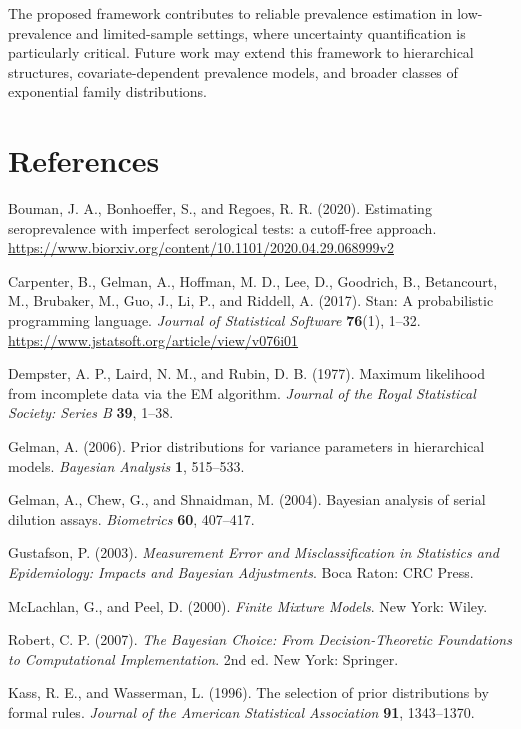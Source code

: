 \documentclass[11pt]{article}
\begin{document}
The proposed framework contributes to reliable prevalence estimation in low-prevalence and limited-sample settings, where uncertainty quantification is particularly critical. Future work may extend this framework to hierarchical structures, covariate-dependent prevalence models, and broader classes of exponential family distributions.



\section*{References}

\noindent

\bibitem Bouman, J. A., Bonhoeffer, S., and Regoes, R. R. (2020).
Estimating seroprevalence with imperfect serological tests: a cutoff-free approach.
{\small \url{https://www.biorxiv.org/content/10.1101/2020.04.29.068999v2}}

\bibitem Carpenter, B., Gelman, A., Hoffman, M. D., Lee, D., Goodrich, B.,
Betancourt, M., Brubaker, M., Guo, J., Li, P., and Riddell, A. (2017).
Stan: A probabilistic programming language.
{\em Journal of Statistical Software} {\bf 76}(1), 1--32.
{\small \url{https://www.jstatsoft.org/article/view/v076i01}}

\bibitem Dempster, A. P., Laird, N. M., and Rubin, D. B. (1977).
Maximum likelihood from incomplete data via the EM algorithm.
{\em Journal of the Royal Statistical Society: Series B} {\bf 39}, 1--38.

\bibitem Gelman, A. (2006).
Prior distributions for variance parameters in hierarchical models.
{\em Bayesian Analysis} {\bf 1}, 515--533.

\bibitem Gelman, A., Chew, G., and Shnaidman, M. (2004).
Bayesian analysis of serial dilution assays.
{\em Biometrics} {\bf 60}, 407--417.

\bibitem Gustafson, P. (2003).
{\em Measurement Error and Misclassification in Statistics and Epidemiology:
	Impacts and Bayesian Adjustments}. Boca Raton: CRC Press.

\bibitem McLachlan, G., and Peel, D. (2000).
{\em Finite Mixture Models}. New York: Wiley.

\bibitem Robert, C. P. (2007).
{\em The Bayesian Choice: From Decision-Theoretic Foundations to Computational Implementation}. 2nd ed. New York: Springer.

\bibitem Kass, R. E., and Wasserman, L. (1996).
The selection of prior distributions by formal rules.
{\em Journal of the American Statistical Association} {\bf 91}, 1343--1370.
\end{document}
